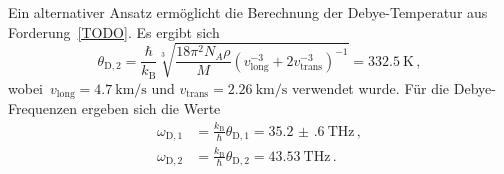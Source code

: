 %
Ein alternativer Ansatz ermöglicht die Berechnung der Debye-Temperatur aus
Forderung~\eqref{TODO}. Es ergibt sich
%
\begin{equation}
  \theta_{\mathrm{D},2}=\frac{\hbar}{k_{\mathrm{B}}}\sqrt[3]{\frac{18\pi^2N_A\rho}{M}\left(v_{\mathrm{long}}^{-3}+2v_{\mathrm{trans}}^{-3}\right)^{-1}}=\SI{332,5}{\kelvin}\, ,
\end{equation}
%
wobei~$v_{\mathrm{long}}=\SI{4.7}{\kilo\metre\per\second}$ und $v_{\mathrm{trans}}=\SI{2.26}{\kilo\metre\per\second}$ verwendet wurde.
Für die Debye-Frequenzen ergeben sich die Werte
%
\begin{align}
  \omega_{\mathrm{D},1}&=\frac{k_{\mathrm{B}}}{\hbar}\theta_{\mathrm{D},1}=\SI{35.2(6)}{\tera\hertz}\, , \\
  \omega_{\mathrm{D},2}&=\frac{k_{\mathrm{B}}}{\hbar}\theta_{\mathrm{D},2}=\SI{43.53}{\tera\hertz}\, .
\end{align}

